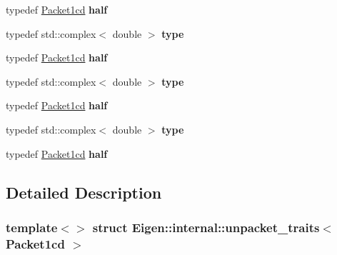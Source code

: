 \begin{DoxyCompactItemize}
typedef \hyperlink{struct_eigen_1_1internal_1_1_packet1cd}{Packet1cd} {\bfseries half}
\item 
\mbox{\label{struct_eigen_1_1internal_1_1unpacket__traits_3_01_packet1cd_01_4_a4e58df3fde2b90a2ecbfdce3fa5256be}} 
typedef std\+::complex$<$ double $>$ {\bfseries type}
\item 
\mbox{\label{struct_eigen_1_1internal_1_1unpacket__traits_3_01_packet1cd_01_4_a2ef255344983f1a9c41803df2024f0af}} 
typedef \hyperlink{struct_eigen_1_1internal_1_1_packet1cd}{Packet1cd} {\bfseries half}
\item 
\mbox{\label{struct_eigen_1_1internal_1_1unpacket__traits_3_01_packet1cd_01_4_a4e58df3fde2b90a2ecbfdce3fa5256be}} 
typedef std\+::complex$<$ double $>$ {\bfseries type}
\item 
\mbox{\label{struct_eigen_1_1internal_1_1unpacket__traits_3_01_packet1cd_01_4_a2ef255344983f1a9c41803df2024f0af}} 
typedef \hyperlink{struct_eigen_1_1internal_1_1_packet1cd}{Packet1cd} {\bfseries half}
\item 
\mbox{\label{struct_eigen_1_1internal_1_1unpacket__traits_3_01_packet1cd_01_4_a4e58df3fde2b90a2ecbfdce3fa5256be}} 
typedef std\+::complex$<$ double $>$ {\bfseries type}
\item 
\mbox{\label{struct_eigen_1_1internal_1_1unpacket__traits_3_01_packet1cd_01_4_a2ef255344983f1a9c41803df2024f0af}} 
typedef \hyperlink{struct_eigen_1_1internal_1_1_packet1cd}{Packet1cd} {\bfseries half}
\end{DoxyCompactItemize}


\subsection{Detailed Description}
\subsubsection*{template$<$$>$\newline
struct Eigen\+::internal\+::unpacket\+\_\+traits$<$ Packet1cd $>$}



